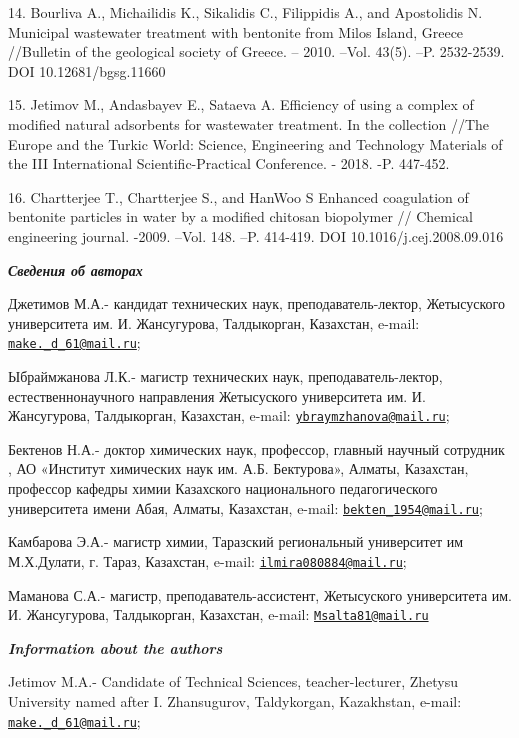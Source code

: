 14. Bourliva A., Michailidis K., Sikalidis C., Filippidis A., and
Apostolidis N. Municipal wastewater treatment with bentonite from Milos
Island, Greece //Bulletin of the geological society of Greece. -- 2010.
--Vol. 43(5). --P. 2532-2539. DOI 10.12681/bgsg.11660

15. Jetimov M., Andasbayev E., Sataeva A. Efficiency of using a complex
of modified natural adsorbents for wastewater treatment. In the
collection //The Europe and the Turkic World: Science, Engineering and
Technology Materials of the III International Scientific-Practical
Conference. - 2018. -P. 447-452.

16. Chartterjee T., Chartterjee S., and HanWoo S Enhanced coagulation of
bentonite particles in water by a modified chitosan biopolymer //
Chemical engineering journal. -2009. --Vol. 148. --P. 414-419. DOI
10.1016/j.cej.2008.09.016

\emph{{\bfseries Сведения об авторах}}

Джетимов М.А.- кандидат технических наук, преподаватель-лектор,
Жетысуского университета им. И. Жансугурова, Талдыкорган, Казахстан,
e-mail:
\href{mailto:make._d_61@mail.ru}{\nolinkurl{make.\_d\_61@mail.ru}};

Ыбраймжанова Л.К.- магистр технических наук, преподаватель-лектор,
естественнонаучного направления Жетысуского университета им. И.
Жансугурова, Талдыкорган, Казахстан, e-mail:
\href{mailto:ybraymzhanova@mail.ru}{\nolinkurl{ybraymzhanova@mail.ru}};

Бектенов Н.А.- доктор химических наук, профессор, главный научный
сотрудник , АО «Институт химических наук им. А.Б. Бектурова», Алматы,
Казахстан, профессор кафедры химии Казахского национального
педагогического университета имени Абая, Алматы, Казахстан, e-mail:
\href{mailto:bekten_1954@mail.ru}{\nolinkurl{bekten\_1954@mail.ru}};

Камбарова Э.А.- магистр химии, Таразский региональный университет им
М.Х.Дулати, г. Тараз, Казахстан, e-mail:
\href{mailto:ilmira080884@mail.ru}{\nolinkurl{ilmira080884@mail.ru}};

Маманова С.А.- магистр, преподаватель-ассистент, Жетысуского
университета им. И. Жансугурова, Талдыкорган, Казахстан, e-mail:
\href{mailto:Msalta81@mail.ru}{\nolinkurl{Msalta81@mail.ru}}

\emph{{\bfseries Information about the authors}}

Jetimov M.A.- Candidate of Technical Sciences, teacher-lecturer, Zhetysu
University named after I. Zhansugurov, Taldykorgan, Kazakhstan, e-mail:
\href{mailto:make._d_61@mail.ru}{\nolinkurl{make.\_d\_61@mail.ru}};

